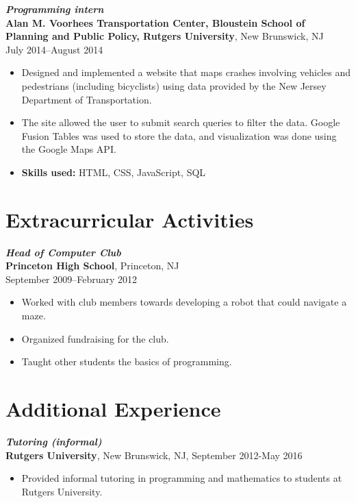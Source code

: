 \documentclass[letterpaper,12pt]{article}
\begin{document}
\textit{\textbf{Programming intern}} \\
\textbf{Alan M. Voorhees Transportation Center, Bloustein School of
  Planning and Public Policy, Rutgers University},
New Brunswick, NJ \\
July 2014--August 2014
\begin{itemize}
\item Designed and implemented a website that maps crashes involving
  vehicles and pedestrians (including bicyclists) using data provided
  by the New Jersey Department of Transportation.
\item The site allowed the user to submit search queries to filter the
  data. Google Fusion Tables was used to store the data, and
  visualization was done using the Google Maps API.
\item \textbf{Skills used:} HTML, CSS, JavaScript, SQL
\end{itemize}

\section*{Extracurricular Activities}

\textit{\textbf{Head of Computer Club}} \\
\textbf{Princeton High School},
Princeton, NJ \\
September 2009--February 2012
\begin{itemize}
\item Worked with club members towards developing a robot that could
  navigate a maze.
\item Organized fundraising for the club.
\item Taught other students the basics of programming.
\end{itemize}

\iffalse
\section*{Additional Experience}

\textit{\textbf{Tutoring (informal)}} \\
\textbf{Rutgers University}, New Brunswick, NJ, September 2012-May
2016
\begin{itemize}
\item Provided informal tutoring in programming and mathematics to
  students at Rutgers University.
\end{itemize}
\end{document}

